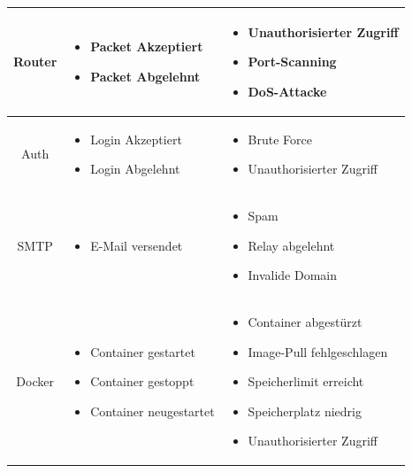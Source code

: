 \documentclass[a4paper,12pt]{report}
\begin{document}
\begin{table}[h!]
\begin{tabular}{|c|p{6cm}|p{6cm}|}
            \textnormal{Router} &
            \begin{itemize}
                \item Packet Akzeptiert
                \item Packet Abgelehnt
            \end{itemize} &
            \begin{itemize}
                \item Unauthorisierter Zugriff
                \item Port-Scanning
                \item DoS-Attacke
            \end{itemize} \\ \hline

            \textnormal{Auth} &
            \begin{itemize}
                \item Login Akzeptiert
                \item Login Abgelehnt
            \end{itemize} &
            \begin{itemize}
                \item Brute Force
                \item Unauthorisierter Zugriff
            \end{itemize} \\ \hline

            \textnormal{SMTP} &
            \begin{itemize}
                \item E-Mail versendet
            \end{itemize} &
            \begin{itemize}
                \item Spam
                \item Relay abgelehnt
                \item Invalide Domain
            \end{itemize} \\ \hline

            \textnormal{Docker} &
            \begin{itemize}
                \item Container gestartet
                \item Container gestoppt
                \item Container neugestartet
            \end{itemize} &
            \begin{itemize}
                \item Container abgestürzt
                \item Image-Pull fehlgeschlagen
                \item Speicherlimit erreicht
                \item Speicherplatz niedrig
                \item Unauthorisierter Zugriff
            \end{itemize} \\ \hline


\end{tabular}
\end{table}
\end{document}
